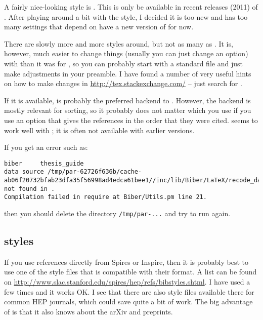A fairly nice-looking style is . This is only be
available in recent releases (2011) of \TeXLive. After playing
around a bit with the  style, I decided it is too new and
has too many settings that depend on have a new version of 
for now.

There are slowly more and more  styles around, but
not as many as \BibTeX. It is, however, much easier to change things
(usually you can just change an option) with  than it
was for \BibTeX, so you can probably start with a standard file and
just make adjustments in your preamble. I have found a number of very
useful hints on how to make changes in
\url{http://tex.stackexchange.com/} -- just search for .

If it is available,  is probably the preferred backend to
. However, the backend is mostly relevant for
sorting, so it probably does not matter which you use if you use an
option that gives the references in the order that they were
cited.  seems to work well with ; it is
often not available with earlier versions.

If you get an error such as:
{\scriptsize
\begin{verbatim}
biber     thesis_guide
data source /tmp/par-62726f636b/cache-ab06f20732bfab23dfa35f56998ad4edca61bee1//inc/lib/Biber/LaTeX/recode_data.xml not found in .
Compilation failed in require at Biber/Utils.pm line 21.
\end{verbatim}
}
\noindent
then you should delete the directory \texttt{/tmp/par-...} and try to
run again.

\subsection{\BibTeX{} styles}
\label{sec:ref:bst}

If you use references directly from Spires or Inspire, then it is
probably best to use one of the style files that is compatible with
their format. A list can be found on
\url{http://www.slac.stanford.edu/spires/hep/refs/bibstyles.shtml}. I
have used  a few times and it works OK. I see that
there are also style files available there for common HEP journals,
which could save quite a bit of work. The big advantage of
 is that it also knows about the arXiv and preprints.

